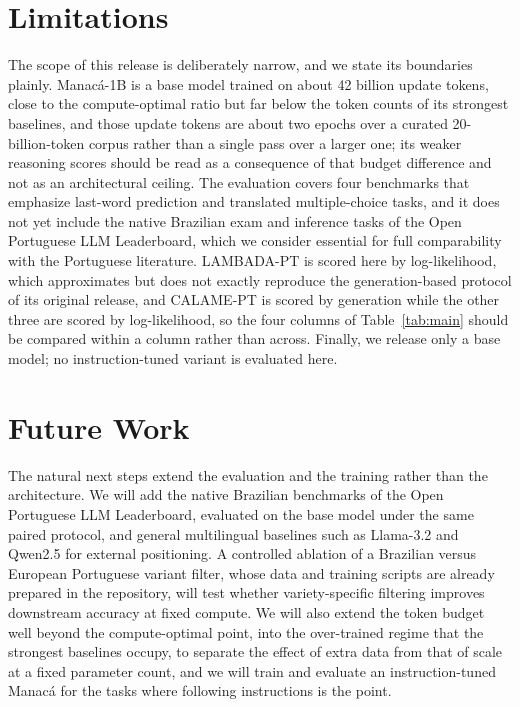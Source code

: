 \documentclass[11pt]{article}
\begin{document}
\section{Limitations}

The scope of this release is deliberately narrow, and we state its boundaries
plainly. Manac\'a-1B is a base model trained on about 42 billion update tokens, close to
the compute-optimal ratio but far below the token counts of its strongest baselines, and
those update tokens are about two epochs over a curated 20-billion-token corpus rather
than a single pass over a larger one; its weaker reasoning scores should be read as a
consequence of that budget difference and not as an architectural ceiling.
The evaluation covers four benchmarks that emphasize last-word prediction and
translated multiple-choice tasks, and it does not yet include the native Brazilian
exam and inference tasks of the Open Portuguese LLM Leaderboard, which we consider
essential for full comparability with the Portuguese literature. LAMBADA-PT is scored
here by log-likelihood, which approximates but does not exactly reproduce the
generation-based protocol of its original release, and CALAME-PT is scored by
generation while the other three are scored by log-likelihood, so the four columns of
Table~\ref{tab:main} should be compared within a column rather than across. Finally,
we release only a base model; no instruction-tuned variant is evaluated here.

\section{Future Work}

The natural next steps extend the evaluation and the training rather than the
architecture. We will add the native Brazilian benchmarks of the Open Portuguese LLM
Leaderboard, evaluated on the base model under the same paired protocol, and general
multilingual baselines such as Llama-3.2 and Qwen2.5 for external positioning. A
controlled ablation of a Brazilian versus European Portuguese variant filter, whose
data and training scripts are already prepared in the repository, will test whether
variety-specific filtering improves downstream accuracy at fixed compute. We will also
extend the token budget well beyond the compute-optimal point, into the over-trained
regime that the strongest baselines occupy, to separate the effect of extra data from
that of scale at a fixed parameter count, and we will train and evaluate an
instruction-tuned Manac\'a for the tasks where following instructions is the point.
\end{document}
